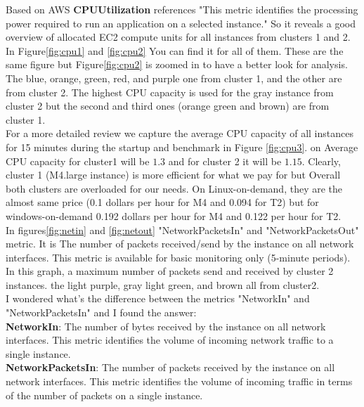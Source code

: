 \documentclass[12pt]{article}
\begin{document}
        Based on AWS \textbf{CPUUtilization} references "This metric identifies the processing power required to run an application on a selected instance." So it reveals a good overview of allocated EC2 compute units for all instances from clusters 1 and 2. In Figure\ref{fig:cpu1} and \ref{fig:cpu2} You can find it for all of them. These are the same figure but Figure\ref{fig:cpu2} is zoomed in to have a better look for analysis. \\
        The blue, orange, green, red, and purple one from cluster 1, and the other are from cluster 2. The highest CPU capacity is used for the gray instance from cluster 2 but the second and third ones (orange green and brown)  are from cluster 1.\\ For a more detailed review  we capture the average CPU capacity of all instances for 15 minutes during the startup and benchmark in Figure \ref{fig:cpu3}. on Average CPU capacity for cluster1 will be $1.3$ and for cluster 2 it will be $1.15$. Clearly, cluster 1 (M4.large instance) is more efficient for what we pay for but Overall both clusters are overloaded for our needs. On Linux-on-demand, they are the almost same price (0.1 dollars per hour for M4 and 0.094 for T2) but for windows-on-demand 0.192 dollars per  hour for M4 and 0.122 per hour for T2.\\
        In figures\ref{fig:netin} and \ref{fig:netout} "NetworkPacketsIn" and  "NetworkPacketsOut" metric. It is The number of packets received/send by the instance on all network interfaces. This metric is available for basic monitoring only (5-minute periods). In this graph, a maximum number of packets send and received by cluster 2 instances. the light purple, gray light green, and brown all from cluster2.\\
          I‌ wondered what's the difference between the metrics "NetworkIn"  and "NetworkPacketsIn" and I‌ found the answer:\\
         \textbf{NetworkIn}:‌ The number of bytes received by the instance on all network interfaces. This metric identifies the volume of incoming network traffic to a single instance.\\
        \textbf{NetworkPacketsIn}: The number of packets received by the instance on all network interfaces. This metric identifies the volume of incoming traffic in terms of the number of packets on a single instance.\\
\end{document}
